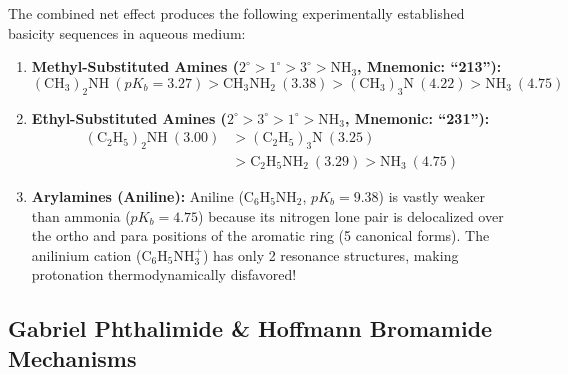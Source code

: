 \documentclass[10pt,twoside,openright]{book}
\begin{document}
\begin{formulabox}
The combined net effect produces the following experimentally established basicity sequences in aqueous medium:
\begin{enumerate}[leftmargin=*]
  \item \textbf{Methyl-Substituted Amines ($2^\circ > 1^\circ > 3^\circ > \mathrm{NH_3}$, Mnemonic: ``213''):}
  \begin{equation}
    \mathbf{\mathrm{(CH_3)_2NH}} \ (pK_b = 3.27) > \mathbf{\mathrm{CH_3NH_2}} \ (3.38) > \mathbf{\mathrm{(CH_3)_3N}} \ (4.22) > \mathbf{\mathrm{NH_3}} \ (4.75)
  \end{equation}
  \item \textbf{Ethyl-Substituted Amines ($2^\circ > 3^\circ > 1^\circ > \mathrm{NH_3}$, Mnemonic: ``231''):}
  \begin{align}
    \mathbf{\mathrm{(C_2H_5)_2NH}} \ (3.00) &> \mathbf{\mathrm{(C_2H_5)_3N}} \ (3.25) \\
    &> \mathbf{\mathrm{C_2H_5NH_2}} \ (3.29) > \mathbf{\mathrm{NH_3}} \ (4.75)
  \end{align}
  \item \textbf{Arylamines (Aniline):}
  Aniline ($\mathrm{C_6H_5NH_2}$, $pK_b = 9.38$) is vastly weaker than ammonia ($pK_b = 4.75$) because its nitrogen lone pair is delocalized over the ortho and para positions of the aromatic ring (5 canonical forms). The anilinium cation ($\mathrm{C_6H_5NH_3^+}$) has only 2 resonance structures, making protonation thermodynamically disfavored!
\end{enumerate}
\end{formulabox}

\subsection{Gabriel Phthalimide \& Hoffmann Bromamide Mechanisms}
\end{document}
